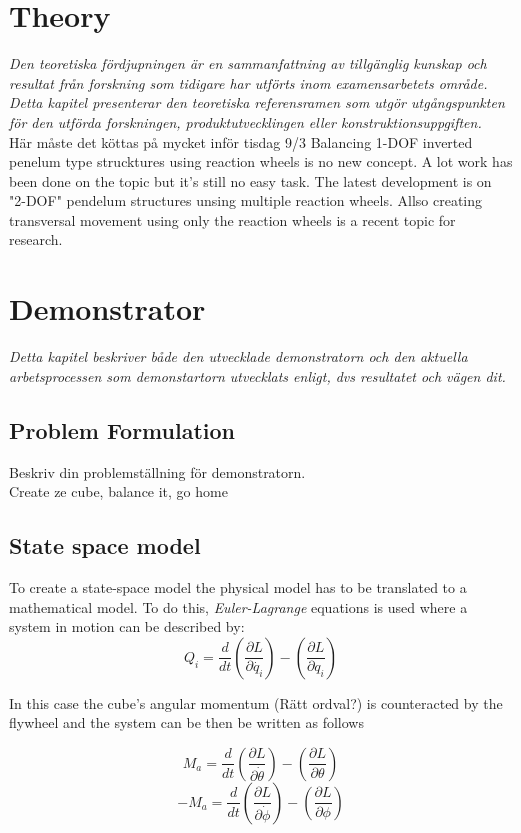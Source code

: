 \documentclass[a4paper,11pt]{kth-mag}
\begin{document}
\chapter{Theory}
\emph{Den teoretiska fördjupningen är en sammanfattning av tillgänglig kunskap och resultat från forskning som tidigare har utförts inom examensarbetets område. Detta kapitel presenterar den teoretiska referensramen som utgör utgångspunkten för den utförda forskningen, produktutvecklingen eller konstruktionsuppgiften.}
\\ Här måste det köttas på mycket inför tisdag 9/3
Balancing 1-DOF inverted penelum type strucktures using reaction wheels is no new concept. A lot work has been done on the topic but it's still no easy task. The latest development is on "2-DOF" pendelum structures unsing multiple reaction wheels. Allso creating transversal movement using only the reaction wheels is a recent topic for research. 
\chapter{Demonstrator}
\emph{Detta kapitel beskriver både den utvecklade demonstratorn och den aktuella arbetsprocessen som demonstartorn utvecklats enligt, dvs resultatet och vägen dit.}


\section{Problem Formulation}
Beskriv din problemställning för demonstratorn.\\
Create ze cube, balance it, go home
\section{State space model}
To create a state-space model the physical model has to be translated to a mathematical model. To do this, \emph{Euler-Lagrange} equations is used where a system in motion can be described by:
\begin{equation}
Q_i=\frac{d}{dt}\left(\frac{\partial L}{\partial \dot{q_i}}\right)-\left(\frac{\partial L}{\partial q_i}\right)
\end{equation}

In this case the cube's angular momentum (Rätt ordval?) is counteracted by the flywheel and the system can be then be written as follows

\begin{equation} \label{eq:positiveL}
M_a=\frac{d}{dt}\left(\frac{\partial L}{\partial \dot{\theta}}\right)-\left(\frac{\partial L}{\partial \theta}\right)
\end{equation}
\begin{equation} \label{eq:negativeL}
-M_a=\frac{d}{dt}\left(\frac{\partial L}{\partial \dot{\phi}}\right)-\left(\frac{\partial L}{\partial \phi}\right)
\end{equation}
\end{document}
